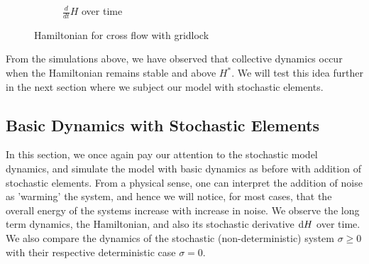 \begin{figure}[H]
\begin{subfigure}{.49\textwidth}
            \caption{$\frac{d}{dt}H$ over time}
            \label{plot:crossgridlock_dh}
        \end{subfigure}
        \caption{Hamiltonian for cross flow with gridlock}
        \label{plot:crossgridlock_hamiltonian}
    \end{figure}


From the simulations above, we have observed that collective dynamics occur when the Hamiltonian remains stable and above $H^*$. We will test this idea further in the next section where we subject our model with stochastic elements.

\subsection{Basic Dynamics with Stochastic Elements}
In this section, we once again pay our attention to the stochastic model dynamics, and simulate the model with basic dynamics as before with addition of stochastic elements. From a physical sense, one can interpret the addition of noise as 'warming' the system, and hence we will notice, for most cases, that the overall energy of the systems increase with increase in noise. We observe the long term dynamics, the Hamiltonian, and also its stochastic derivative $\mathrm d H$ over time. We also compare the dynamics of the stochastic (non-deterministic) system $\sigma \geq 0$ with their respective deterministic case $\sigma = 0$.

